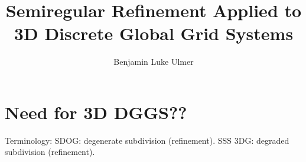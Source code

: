 \documentclass[12pt]{ucalgthes1}
\title{Semiregular Refinement Applied to 3D Discrete Global Grid Systems}
\author{Benjamin Luke Ulmer}
\begin{document}





\chapter{Need for 3D DGGS??}
Terminology:
SDOG: degenerate subdivision (refinement). SSS 3DG: degraded subdivision (refinement).







\appendix



\nocite{*}

\end{document}
